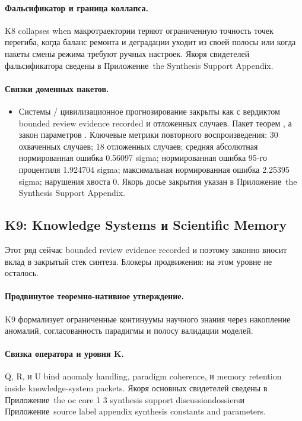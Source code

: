 \paragraph{Фальсификатор и граница коллапса.}
K8 collapses when макротраектории теряют ограниченную точность точек перегиба, когда баланс ремонта и деградации уходит из своей полосы или когда пакеты смены режима требуют ручных настроек.
Якоря свидетелей фальсификатора сведены в Приложение~the Synthesis Support Appendix.

\paragraph{Связки доменных пакетов.}
\begin{itemize}[leftmargin=1.6em,nosep]
\item Системы / цивилизационное прогнозирование закрыты как  с вердиктом bounded review evidence recorded и  отложенных случаев. Пакет теорем , а закон параметров . Ключевые метрики повторного воспроизведения: 30 охваченных случаев; 18 отложенных случаев; средняя абсолютная нормированная ошибка 0.56097 sigma; нормированная ошибка 95-го процентиля 1.924704 sigma; максимальная нормированная ошибка 2.25395 sigma; нарушения хвоста 0. Якорь досье закрытия указан в Приложение~the Synthesis Support Appendix.
\end{itemize}

\subsection{K9: Knowledge Systems и Scientific Memory}
\label{sec:oc-core-1-3-synthesis-k9}
Этот ряд сейчас bounded review evidence recorded и поэтому законно вносит вклад в закрытый стек синтеза.
Блокеры продвижения: на этом уровне не осталось.

\paragraph{Продвинутое теоремно-нативное утверждение.}
K9 формализует ограниченные континуумы научного знания через накопление аномалий, согласованность парадигмы и полосу валидации моделей.

\paragraph{Связка оператора и уровня K.}
Q, R, и U bind anomaly handling, paradigm coherence, и memory retention inside knowledge-system packets.
Якоря основных свидетелей сведены в Приложение~the oc core 1 3 synthesis support discussiondossiersи Приложение~source label appendix synthesis constants and parameters.

